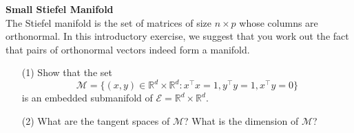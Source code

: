 \documentclass[en, oneside]{assignment}
\begin{document}
\begin{prob} \textbf{Small Stiefel Manifold}\\
    The Stiefel manifold is the set of matrices of size $n\times p$ whose columns are orthonormal. 
    In this introductory exercise, we suggest that you work out the fact that pairs of orthonormal vectors indeed form a manifold. 
    \begin{itemize}
        \item[(1)] Show that the set
        \begin{equation*}
            \mathcal{M} = \{(x, y) \in \mathbb{R}^d \times \mathbb{R}^d : x^\top x = 1, y^\top y = 1, x^\top y = 0\}  
        \end{equation*}
        is an embedded submanifold of $\mathcal{E} = \mathbb{R}^d \times \mathbb{R}^d$.
        \item[(2)] What are the tangent spaces of $\mathcal{M}$? What is the dimension of $\mathcal{M}$?
    \end{itemize}
\end{prob}
\end{document}
